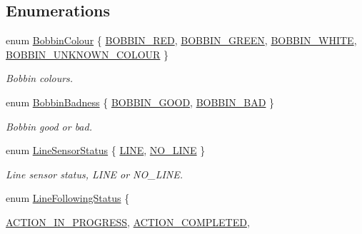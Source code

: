 \subsection*{Enumerations}
\begin{DoxyCompactItemize}
\item 
enum \hyperlink{namespaceIDP_a6efd2cca14c0dae1c6458714ce0218df}{BobbinColour} \{ \hyperlink{namespaceIDP_a6efd2cca14c0dae1c6458714ce0218dfa1bbb59488c1d089eefb9b54146bcdb26}{BOBBIN\_\-RED}, 
\hyperlink{namespaceIDP_a6efd2cca14c0dae1c6458714ce0218dfa047d7c5fcd5669f1a819d05fb5319f0b}{BOBBIN\_\-GREEN}, 
\hyperlink{namespaceIDP_a6efd2cca14c0dae1c6458714ce0218dfa8f427bfb1c335650a7ada595e1607d00}{BOBBIN\_\-WHITE}, 
\hyperlink{namespaceIDP_a6efd2cca14c0dae1c6458714ce0218dfae984bae9f90d601380152191c3c1b460}{BOBBIN\_\-UNKNOWN\_\-COLOUR}
 \}
\begin{DoxyCompactList}\small\item\em Bobbin colours. \item\end{DoxyCompactList}\item 
enum \hyperlink{namespaceIDP_adf12b2c1e1c228810b18c34a3c88c32d}{BobbinBadness} \{ \hyperlink{namespaceIDP_adf12b2c1e1c228810b18c34a3c88c32dafdc1b8b5a9d849fd99ac2ae438b632dd}{BOBBIN\_\-GOOD}, 
\hyperlink{namespaceIDP_adf12b2c1e1c228810b18c34a3c88c32da6cb4993a316e9d4dc9836d3d990fd0f6}{BOBBIN\_\-BAD}
 \}
\begin{DoxyCompactList}\small\item\em Bobbin good or bad. \item\end{DoxyCompactList}\item 
enum \hyperlink{namespaceIDP_afc3b1d4cbb313bfc854f49d6f23b25f7}{LineSensorStatus} \{ \hyperlink{namespaceIDP_afc3b1d4cbb313bfc854f49d6f23b25f7ab8f6b528c0b2fd3edfdd6463cc6a2fd2}{LINE}, 
\hyperlink{namespaceIDP_afc3b1d4cbb313bfc854f49d6f23b25f7a8f85d4834fc4519df3f2053201d497d1}{NO\_\-LINE}
 \}
\begin{DoxyCompactList}\small\item\em Line sensor status, LINE or NO\_\-LINE. \item\end{DoxyCompactList}\item 
enum \hyperlink{namespaceIDP_a5993bdfdd901fc5521c8df42dca43bd0}{LineFollowingStatus} \{ \par
\hyperlink{namespaceIDP_a5993bdfdd901fc5521c8df42dca43bd0a392b1fde04c7c0a442405be80f874159}{ACTION\_\-IN\_\-PROGRESS}, 
\hyperlink{namespaceIDP_a5993bdfdd901fc5521c8df42dca43bd0a1347f71adefd32a09a46af0c452f2884}{ACTION\_\-COMPLETED}, 

\end{DoxyCompactItemize}
